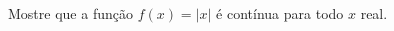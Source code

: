 \begin{frame}
  \begin{columns}[onlytextwidth]
    \begin{column}{0.4\textwidth}\vspace{-0.5cm}
      \begin{example}
        Mostre que a função $f(x) = |x|$ é contínua para todo $x$ real.
      \end{example}
    \end{column}
    \begin{column}{0.59\textwidth}
      \begin{figure}
      \end{figure}
    \end{column}
  \end{columns}
\end{frame}

